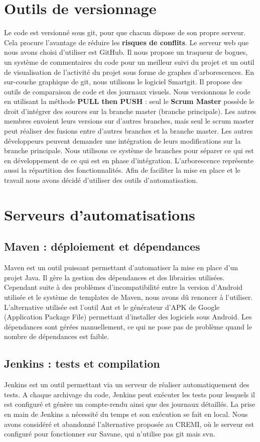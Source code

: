 \section{Outils de versionnage}
Le code est versionné sous git, pour que chacun dispose de son propre serveur. Cela procure l'avantage de réduire les \textbf{risques de conflits}. Le serveur web que nous avons choisi 
d'utiliser est GitHub. Il nous propose un traqueur de bogues, un système de commentaires du code pour un meilleur suivi du projet et un outil de visualisation de l'activité du projet sous forme de graphes d'arborescences. En sur-couche graphique de git, nous utilisons le logiciel Smartgit. Il propose des outils de comparaison de code et des
journaux visuels.
Nous versionnons le code en utilisant la méthode \textbf{PULL then PUSH} : seul le \textbf{Scrum Master} possède le droit d'intégrer des
sources sur la branche master (branche principale). Les autres membres envoient leurs versions sur d'autres
branches, mais seul le scrum master peut réaliser des fusions entre d'autres branches et la branche master. Les
autres développeurs peuvent demander une intégration de leurs modifications sur la branche principale. Nous utilisons ce système de branches pour séparer ce qui est en développement de ce qui est en phase d'intégration. L'arborescence représente aussi la répartition des fonctionnalités.
Afin de faciliter la mise en place et le travail nous avons décidé d'utiliser des outils d'automatisation.

\section{Serveurs d'automatisations}

\subsection{Maven : déploiement et dépendances}
Maven est un outil puissant permettant d'automatiser la mise en place d'un projet Java. Il gère la gestion des dépendances et des librairies utilisées. Cependant suite à des problèmes d'incompatibilité entre la version d'Android utilisée et le système de templates de Maven, nous avons dû renoncer à l'utiliser.
L'alternative utilisée est l'outil Ant et le générateur d'APK de Google (Application Package File) permettant d'installer des logiciels sous Android. Les dépendances sont gérées manuellement, ce qui ne pose pas de problème quand le nombre de dépendances est faible.

\subsection{Jenkins : tests et compilation}
Jenkins est un outil permettant via un serveur de réaliser automatiquement des tests. A chaque archivage du code, Jenkins peut exécuter les tests pour lesquels il est configuré et génère
un compte-rendu ainsi que des journaux détaillés. La prise en main de Jenkins a nécessité du temps et son exécution
se fait en local. Nous avons considéré et abandonné l'alternative proposée au CREMI, où le serveur est configuré pour fonctionner sur Savane, qui n'utilise pas git mais svn.

